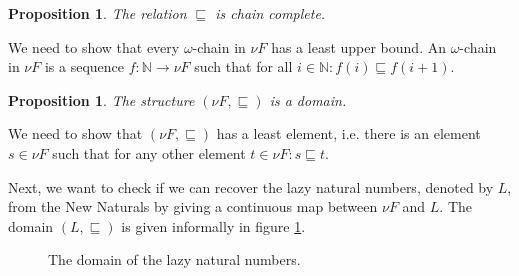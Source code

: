 \documentclass[a4paper]{article}
\newcommand{\arr}{\rightarrow}
\newtheorem{thmPONuFisChainComplete}[defNuF]{Proposition}
\newtheorem{thmPONuFisADomain}[defNuF]{Proposition}
\begin{document}
\begin{thmPONuFisChainComplete}

The relation $\sqsubseteq$ is chain complete.

\end{thmPONuFisChainComplete}

We need to show that every $\omega$-chain in $\nu F$ has a least upper bound.
An $\omega$-chain in $\nu F$ is a sequence $f : \mathbb{N} \arr \nu F$ such
that for all $i \in \mathbb{N}: f(i) \sqsubseteq f(i + 1)$.


\begin{thmPONuFisADomain}

The structure $(\nu F, \sqsubseteq)$ is a domain.

\end{thmPONuFisADomain}

We need to show that $(\nu F, \sqsubseteq)$ has a least element, i.e. there is
an element $s \in \nu F$ such that for any other element $t \in \nu F: s
\sqsubseteq t$.

Next, we want to check if we can recover the lazy natural numbers, denoted by
$L$, from the New Naturals by giving a continuous map between $\nu F$ and $L$.
The domain $(L, \sqsubseteq)$ is given informally in figure
\ref{fig:DomainOfLazyNaturals}.


\begin{figure}
\begin{center}
\end{center}
\caption{The domain of the lazy natural numbers.}
\label{fig:DomainOfLazyNaturals}
\end{figure}
\end{document}
